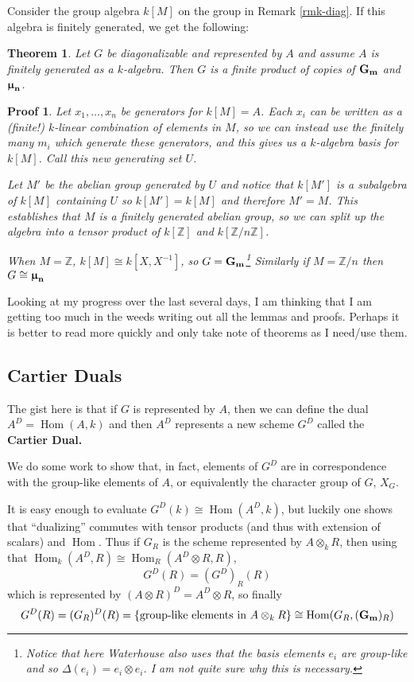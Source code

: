 \documentclass[12pt]{article}
\theoremstyle{nonumberbreak}
\theoremstyle{changebreak}
\newtheorem{thm}{Theorem}[subsection]
\theoremstyle{nonumberplain}
\newtheorem{prf}{Proof}
\theoremstyle{change}
\newcommand*{\bbZ}{\mathbb{Z}}
\DeclareMathOperator{\Hom}{Hom}
\newcommand{\Gm}{\ensuremath\mathbf{G_m}}
\newcommand*{\mun}[1]{\ensuremath\mathbf{\bm\upmu_#1}}
\begin{document}
Consider the group algebra $k[M]$ on the group in Remark \ref{rmk-diag}. If this algebra
is finitely generated, we get the following:
\begin{thm}
	Let $G$ be diagonalizable and represented by $A$ and assume $A$ is finitely generated
	as a $k$-algebra. Then $G$ is a finite product of copies of $\Gm$ and $\mun n$.
\end{thm}
\begin{prf}
	Let $x_1,\dots, x_n$ be generators for $k[M]=A$. Each $x_i$ can be written as a (finite!)
	$k$-linear combination of elements in $M$, so we can instead use the finitely many $m_i$
	which generate these generators, and this gives us a $k$-algebra basis for $k[M]$. Call this
	new generating set $U$. 

	Let $M'$ be the abelian group generated by $U$ and notice that $k[M']$ is a subalgebra of
	$k[M]$ containing $U$ so $k[M']=k[M]$ and therefore $M'=M$. This establishes that $M$ is 
	a finitely generated abelian group, so we can split up the algebra into a tensor product
	of $k[\bbZ]$ and $k[\bbZ/n\bbZ]$.

	When $M=\bbZ$, $k[M]\cong k[X,X^{-1}]$, so $G= \Gm$\footnote{Notice that here Waterhouse also
	uses that the basis elements $e_i$ are group-like and so $\Delta(e_i)=e_i\otimes e_i$. I am not
	quite sure why this is necessary.} Similarly if $M=\bbZ/n$ then $G\cong \mun{n}$
\end{prf}

Looking at my progress over the last several days, I am thinking that I am getting
too much in the weeds writing out all the lemmas and proofs. Perhaps it is better to read more quickly
and only take note of theorems as I need/use them.

\subsection{Cartier Duals}
The gist here is that if $G$ is represented by $A$, then we can define the dual 
$A^D=\Hom(A,k)$ and then $A^D$ represents a new scheme $G^D$ called the \textbf{Cartier Dual.}

We do some work to show that, in fact, elements of $G^D$ are in correspondence with the 
group-like elements of $A$, or equivalently the character group of $G$, $X_G$.

It is easy enough to evaluate $G^D(k)\cong\Hom(A^D,k)$, but luckily one shows that
``dualizing'' commutes with tensor products (and thus with extension of scalars) and $\Hom$. Thus
if $G_R$ is the scheme represented by $A\otimes_k R$, then using that $\Hom_k(A^D,R)\cong\Hom_R(A^D\otimes R,R)$,
\[G^D(R)=(G^D)_R(R)\]
which is represented by $(A\otimes R)^D=A^D\otimes R$, so finally 
\[G^D(R)=(G_R)^D(R)=\{\text{group-like elements in }A\otimes_k R\}\cong \Hom(G_R,(\Gm)_R)\]
\end{document}
